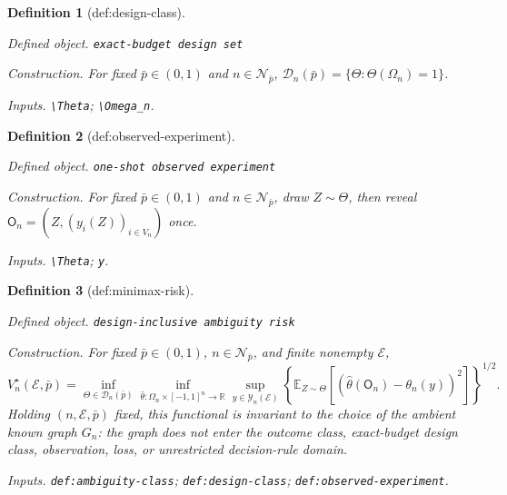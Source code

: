 \documentclass{article}
\newtheorem{definition}{Definition}
\begin{document}
\begin{definition}[def:design-class]\label{def:design-class}
\par\smallskip\noindent\emph{Defined object.} \texttt{exact-\allowbreak{}budget design set}
\par\smallskip\noindent\emph{Construction.} For fixed \(\bar p\in(0,1)\) and \(n\in\mathcal N_{\bar p}\), \(\mathcal D_n(\bar p)=\{\Theta:\Theta(\Omega_n)=1\}\).
\par\smallskip\noindent\emph{Inputs.} \texttt{\textbackslash{}\allowbreak{}Theta}; \texttt{\textbackslash{}\allowbreak{}Omega\_\allowbreak{}n}.
\end{definition}

\begin{definition}[def:observed-experiment]\label{def:observed-experiment}
\par\smallskip\noindent\emph{Defined object.} \texttt{one-\allowbreak{}shot observed experiment}
\par\smallskip\noindent\emph{Construction.} For fixed \(\bar p\in(0,1)\) and \(n\in\mathcal N_{\bar p}\), draw \(Z\sim\Theta\), then reveal \(\mathsf O_n=(Z,(y_i(Z))_{i\in V_n})\) once.
\par\smallskip\noindent\emph{Inputs.} \texttt{\textbackslash{}\allowbreak{}Theta}; \texttt{y}.
\end{definition}

\begin{definition}[def:minimax-risk]\label{def:minimax-risk}
\par\smallskip\noindent\emph{Defined object.} \texttt{design-\allowbreak{}inclusive ambiguity risk}
\par\smallskip\noindent\emph{Construction.} For fixed \(\bar p\in(0,1)\), \(n\in\mathcal N_{\bar p}\), and finite nonempty \(\mathcal E\),
\[
V_n^\star(\mathcal E,\bar p)
=\inf_{\Theta\in\mathcal D_n(\bar p)}
 \inf_{\widehat\theta:\Omega_n\times[-1,1]^n\to\mathbb R}
 \sup_{y\in\mathcal Y_n(\mathcal E)}
 \left\{\mathbb E_{Z\sim\Theta}
 \left[(\widehat\theta(\mathsf O_n)-\theta_n(y))^2\right]\right\}^{1/2}.
\]
Holding \((n,\mathcal E,\bar p)\) fixed, this functional is invariant to the choice of the ambient known graph \(G_n\): the graph does not enter the outcome class, exact-budget design class, observation, loss, or unrestricted decision-rule domain.
\par\smallskip\noindent\emph{Inputs.} \texttt{def:\allowbreak{}ambiguity-\allowbreak{}class}; \texttt{def:\allowbreak{}design-\allowbreak{}class}; \texttt{def:\allowbreak{}observed-\allowbreak{}experiment}.
\end{definition}
\end{document}
